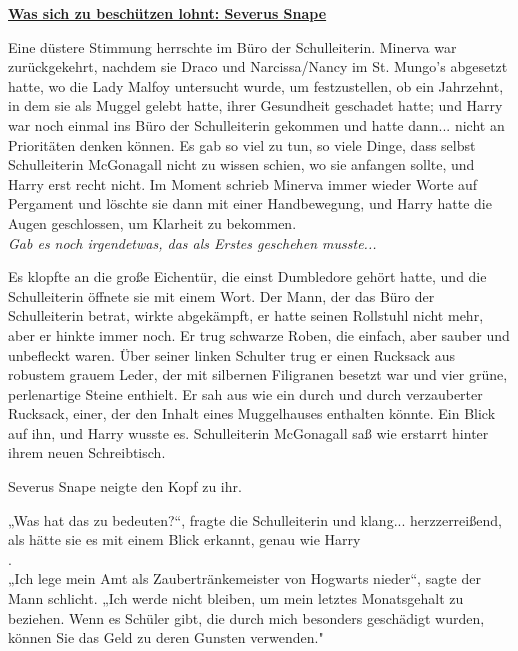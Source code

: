 

\hypertarget{was-sich-zu-beschuxfctzen-lohnt-severus-snape}{%

\textbf{\uline{Was sich zu beschützen lohnt: Severus Snape}}

\hfill\break Eine düstere Stimmung herrschte im Büro der Schulleiterin. Minerva war zurückgekehrt, nachdem sie Draco und Narcissa/Nancy im St. Mungo's abgesetzt hatte, wo die Lady Malfoy untersucht wurde, um festzustellen, ob ein Jahrzehnt, in dem sie als Muggel gelebt hatte, ihrer Gesundheit geschadet hatte; und Harry war noch einmal ins Büro der Schulleiterin gekommen und hatte dann... nicht an Prioritäten denken können. Es gab so viel zu tun, so viele Dinge, dass selbst Schulleiterin McGonagall nicht zu wissen schien, wo sie anfangen sollte, und Harry erst recht nicht. Im Moment schrieb Minerva immer wieder Worte auf Pergament und löschte sie dann mit einer Handbewegung, und Harry hatte die Augen geschlossen, um Klarheit zu bekommen.\\ \emph{\hfill\break Gab es noch irgendetwas, das als Erstes geschehen musste...}

Es klopfte an die große Eichentür, die einst Dumbledore gehört hatte, und die Schulleiterin öffnete sie mit einem Wort. Der Mann, der das Büro der Schulleiterin betrat, wirkte abgekämpft, er hatte seinen Rollstuhl nicht mehr, aber er hinkte immer noch. Er trug schwarze Roben, die einfach, aber sauber und unbefleckt waren. Über seiner linken Schulter trug er einen Rucksack aus robustem grauem Leder, der mit silbernen Filigranen besetzt war und vier grüne, perlenartige Steine enthielt. Er sah aus wie ein durch und durch verzauberter Rucksack, einer, der den Inhalt eines Muggelhauses enthalten könnte. Ein Blick auf ihn, und Harry wusste es. Schulleiterin McGonagall saß wie erstarrt hinter ihrem neuen Schreibtisch.

Severus Snape neigte den Kopf zu ihr.

„Was hat das zu bedeuten?“, fragte die Schulleiterin und klang... herzzerreißend, als hätte sie es mit einem Blick erkannt, genau wie Harry\\ .\\ „Ich lege mein Amt als Zaubertränkemeister von Hogwarts nieder“, sagte der Mann schlicht. „Ich werde nicht bleiben, um mein letztes Monatsgehalt zu beziehen. Wenn es Schüler gibt, die durch mich besonders geschädigt wurden, können Sie das Geld zu deren Gunsten verwenden."

}

